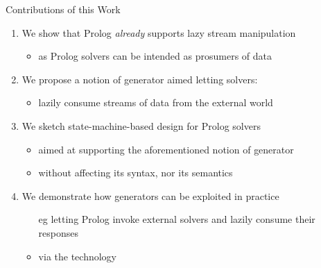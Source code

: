 \documentclass[presentation]{beamer}
\begin{document}
\begin{frame}{Contributions of this Work}

    \begin{enumerate}
        \item We show that Prolog \emph{already} supports lazy stream manipulation
        \begin{itemize}
            \item as Prolog solvers can be intended as \alert{prosumers} of data
        \end{itemize}
        
        \vfill
        
        \item We propose a notion of \alert{generator} aimed letting solvers:
        \begin{itemize}
            \item lazily consume streams of data from the external world
        \end{itemize}

        \vfill  
        
        \item We sketch \alert{state-machine-based} design for Prolog solvers
        \begin{itemize}
            \item aimed at supporting the aforementioned notion of \alert{generator}
            \item without affecting its syntax, nor its semantics
        \end{itemize}

        \vfill  

        \item We demonstrate how generators can be exploited in practice
        \begin{itemize}
            \item[eg] letting Prolog invoke external solvers and lazily consume their responses
            \item via the \twopkt{} technology 
        \end{itemize}
    \end{enumerate}

\end{frame}
\end{document}
